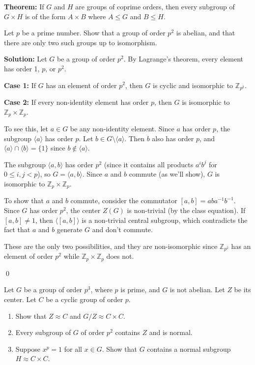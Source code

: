 \textbf{Theorem:} If $G$ and $H$ are groups of coprime orders, then every subgroup of $G \times H$ is of the form $A \times B$ where $A \leq G$ and $B \leq H$.

\begin{problembox}
Let $p$ be a prime number. Show that a group of order $p^2$ is abelian, and that there are only two such groups up to isomorphism.
\end{problembox}

\noindent\textbf{Solution:} Let $G$ be a group of order $p^2$. By Lagrange's theorem, every element has order 1, $p$, or $p^2$.

\textbf{Case 1:} If $G$ has an element of order $p^2$, then $G$ is cyclic and isomorphic to $\mathbb{Z}_{p^2}$.

\textbf{Case 2:} If every non-identity element has order $p$, then $G$ is isomorphic to $\mathbb{Z}_p \times \mathbb{Z}_p$.

To see this, let $a \in G$ be any non-identity element. Since $a$ has order $p$, the subgroup $\langle a \rangle$ has order $p$. Let $b \in G \setminus \langle a \rangle$. Then $b$ also has order $p$, and $\langle a \rangle \cap \langle b \rangle = \{1\}$ since $b \notin \langle a \rangle$.

The subgroup $\langle a, b \rangle$ has order $p^2$ (since it contains all products $a^ib^j$ for $0 \leq i, j < p$), so $G = \langle a, b \rangle$. Since $a$ and $b$ commute (as we'll show), $G$ is isomorphic to $\mathbb{Z}_p \times \mathbb{Z}_p$.

To show that $a$ and $b$ commute, consider the commutator $[a,b] = aba^{-1}b^{-1}$. Since $G$ has order $p^2$, the center $Z(G)$ is non-trivial (by the class equation). If $[a,b] \neq 1$, then $\langle [a,b] \rangle$ is a non-trivial central subgroup, which contradicts the fact that $a$ and $b$ generate $G$ and don't commute.

These are the only two possibilities, and they are non-isomorphic since $\mathbb{Z}_{p^2}$ has an element of order $p^2$ while $\mathbb{Z}_p \times \mathbb{Z}_p$ does not.


\qed
\begin{problembox}
Let $G$ be a group of order $p^3$, where $p$ is prime, and $G$ is not abelian. Let $Z$ be its center. Let $C$ be a cyclic group of order $p$.
\begin{enumerate}[label=(\alph*)]
\item Show that $Z \approx C$ and $G/Z \approx C \times C$.
\item Every subgroup of $G$ of order $p^2$ contains $Z$ and is normal.
\item Suppose $x^p = 1$ for all $x \in G$. Show that $G$ contains a normal subgroup $H \approx C \times C$.
\end{enumerate}
\end{problembox}

